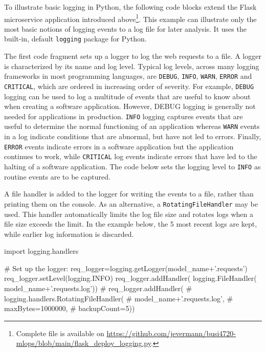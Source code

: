 \begin{withcode}
To illustrate basic logging in Python, the following code blocks extend the Flask microservice application introduced above\footnote{Complete file is available on \url{https://github.com/jevermann/busi4720-mlops/blob/main/flask_deploy_logging.py}.}. This example can illustrate only the most basic notions of logging events to a log file for later analysis. It uses the built-in, default \texttt{logging} package for Python.

The first code fragment sets up a logger to log the web requests to a file. A logger is characterized by its name and log level. Typical log levels, across many logging frameworks in most programming languages, are \texttt{DEBUG}, \texttt{INFO}, \texttt{WARN}, \texttt{ERROR} and \texttt{CRITICAL}, which are ordered in increasing order of severity. For example, \texttt{DEBUG} logging can be used to log a multitude of events that are useful to know about when creating a software application. However, DEBUG logging is generally not needed for applications in production. \texttt{INFO} logging captures events that are useful to determine the normal functioning of an application whereas \texttt{WARN} events in a log indicate conditions that are abnormal, but have not led to errors. Finally, \texttt{ERROR} events indicate errors in a software application but the application continues to work, while \texttt{CRITICAL} log events indicate errors that have led to the halting of a software application. The code below sets the logging level to \texttt{INFO} as routine events are to be captured. 

A file handler is added to the logger for writing the events to a file, rather than printing them on the console. As an alternative, a \texttt{RotatingFileHandler} may be used. This handler automatically limits the log file size and rotates logs when a file size exceeds the limit. In the example below, the 5 most recent logs are kept, while earlier log information is discarded. 

\begin{pythoncode}
import logging.handlers

# Set up the logger:
req_logger=logging.getLogger(model_name+'.requests')
req_logger.setLevel(logging.INFO)
req_logger.addHandler(
    logging.FileHandler(
        model_name+'.requests.log'))
# req_logger.addHandler(
#     logging.handlers.RotatingFileHandler(
#         model_name+'.requests.log',
#         maxBytes=1000000,
#         backupCount=5))
\end{pythoncode}


\end{withcode}
